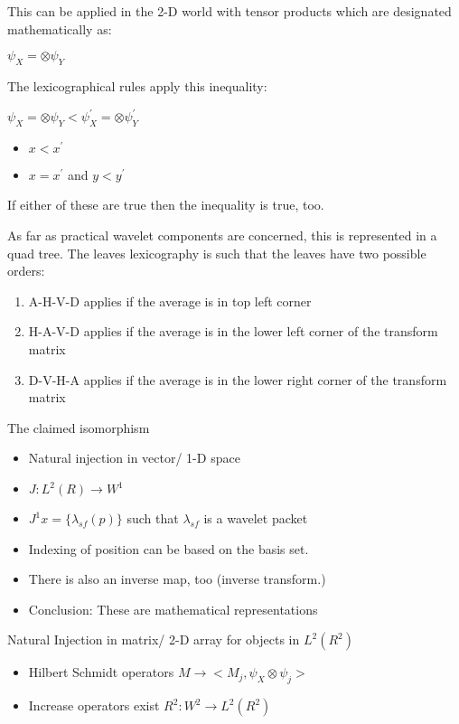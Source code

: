 \documentclass[11pt]{book}
\begin{document}
This can be applied in the 2-D world with tensor products which are designated mathematically as:

\begin{center}
$\psi_X = \otimes \psi_Y$
\end{center}

The lexicographical rules apply this inequality:

\begin{center}
$\psi_X = \otimes \psi_Y < \psi^\prime_X = \otimes \psi^\prime_Y $
\end{center}
\begin{itemize}
\item $x < x^\prime$ 
\item $ x = x^\prime $ and $ y < y^\prime$
\end{itemize}

If either of these are true then the inequality is true, too.

As far as practical wavelet components are concerned, this is represented in a quad tree.  The leaves lexicography is such that the leaves have two possible orders:
\begin{enumerate}
\item A-H-V-D applies if the average is in top left corner 
\item H-A-V-D applies if the average is in the lower left corner of the transform matrix
\item D-V-H-A applies if the average is in the lower right corner of the transform matrix
\end{enumerate}

The claimed isomorphism 


\begin{itemize}
\item Natural injection in vector/ 1-D space
\item $J:L^2(R) \to W^1$
\item $J^1x = \{\lambda_{sf} (p) \}$ such that $\lambda_{sf}$ is a wavelet packet
\item Indexing of position can be based on the basis set.
\item There is also an inverse map, too (inverse transform.) 
\item Conclusion: These are mathematical representations
\end{itemize}

Natural Injection in matrix/ 2-D array for objects in $L^2(R^2)$
\begin{itemize}
\item Hilbert Schmidt operators $M\to <M_j , \psi_X \otimes \psi_j>$
\item Increase operators exist $R^2 : W^2 \to L^2(R^2)$
\end{itemize}
\end{document}

